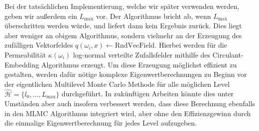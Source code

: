 Bei der tatsächlichen Implementierung, welche wir später verwenden werden, geben wir außerdem ein $ L_{\max} $ vor. Der Algorithmus bricht ab, wenn $ L_{\max} $ überschritten werden würde, und liefert dann kein Ergebnis zurück.
Dies liegt aber weniger an obigem Algorithmus, sondern vielmehr an der Erzeugung des zufälligen Vektorfeldes $ q(\omega_i,x) \leftarrow \text{RndVecField} $. Hierbei werden für die Permeabilität $ \kappa(\omega_i) $ log-normal verteilte Zufallsfelder mithilfe des Circulant-Embedding Algorithmus erzeugt. Um diese Erzeugung möglichst effizient zu gestalten, werden dafür nötige komplexe Eigenwertberechnungen zu Beginn vor der eigentlichen Multilevel Monte Carlo Methode für alle möglichen Level $ \widehat{\mathcal{H}} = \{ l_0,\dots,L_{\max}\}$ durchgeführt.
In zukünftigen Arbeiten könnte dies unter Umständen aber auch insofern verbessert werden, dass diese Berechnung ebenfalls in den MLMC Algorithmus integriert wird, aber ohne den Effizienzgewinn durch die einmalige Eigenwertberechnung für jedes Level aufzugeben.
 
 
 
%

